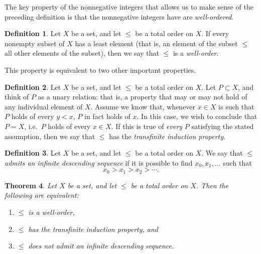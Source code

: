 \documentclass[letterpaper]{article}
\newtheorem{theorem}{Theorem}[section]
\theoremstyle{definition}
\newtheorem{definition}[theorem]{Definition}
\begin{document}
The key property of the nonnegative integers that allows us to make
sense of the preceding definition is that the nonnegative integers
have are \emph{well-ordered}.
\begin{definition}
  Let \(X\) be a set, and let \(\leq\) be a total order on \(X\).  If
  every nonempty subset of \(X\) has a least element (that is, an
  element of the subset \(\leq\) all other elements of the subset),
  then we say that \(\leq\) is a \emph{well-order}.
\end{definition}

This property is equivalent to two other important properties.
\begin{definition}
  Let \(X\) be a set, and let \(\leq\) be a total order on \(X\).  Let
  \(P \subset X\), and think of \(P\) as a unary relation: that is, a
  property that may or may not hold of any individual element of
  \(X\).  Assume we know that, whenever \(x \in X\) is such that \(P\)
  holds of every \(y < x\), \(P\) in fact holds of \(x\).  In this
  case, we wish to conclude that \(P = X\), i.e.\ \(P\) holds of every
  \(x \in X\).  If this is true of \emph{every} \(P\) satisfying the
  stated assumption, then we say that \(\leq\) has the
  \emph{transfinite induction property}.
\end{definition}
\begin{definition}
  Let \(X\) be a set, and let \(\leq\) be a total order on \(X\).  We
  say that \(\leq\) \emph{admits an infinite descending sequence} if
  it is possible to find \(x_0, x_1, \ldots\) such that
  \[x_0 > x_1 > x_2 > \cdots \text{.}\]
\end{definition}
\begin{theorem}
  Let \(X\) be a set, and let \(\leq\) be a total order on \(X\).
  Then the following are equivalent:
  \begin{enumerate}
    \item\label{enum:wo-tfae-wo} \(\leq\) is a well-order,
    \item\label{enum:wo-tfae-ind} \(\leq\) has the transfinite induction property, and
    \item\label{enum:wo-tfae-desc} \(\leq\) does not admit an infinite descending sequence.
  \end{enumerate}
\end{theorem}
\end{document}
